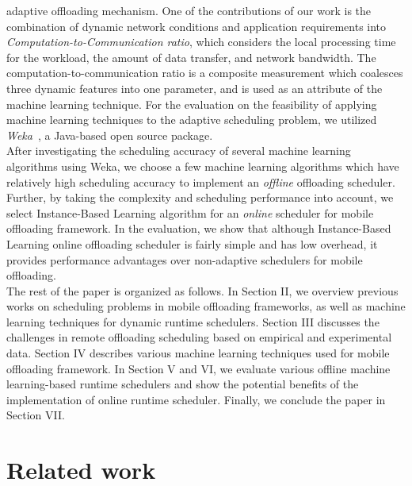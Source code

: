 \documentclass[10pt, conference, compsocconf]{IEEEtran}
\begin{document}
adaptive offloading mechanism.
%
One of the contributions of our work is the combination of dynamic network
conditions and application requirements into
\textit{Computation-to-Communication ratio}, which considers the local
processing time for the workload, the amount of data transfer, and
network bandwidth.
%
The computation-to-communication ratio is a composite
measurement which coalesces three dynamic features into one parameter,
and is used as an attribute of the machine learning technique.
%
For the evaluation on the feasibility of applying machine learning
techniques to the adaptive scheduling problem, we utilized
\textit{Weka}~\cite{weka}, a Java-based open source package.\\
%
\indent After investigating the scheduling accuracy of several machine
learning algorithms using Weka, we choose a few machine learning
algorithms which have relatively high scheduling accuracy 
to implement an \textit{offline} offloading scheduler.
%
Further, by taking the complexity and scheduling performance into
account, we select Instance-Based Learning algorithm for 
an \textit{online} scheduler for mobile offloading framework.
%
In the evaluation, we show that although Instance-Based Learning 
online offloading scheduler is fairly simple and has low overhead, 
it provides performance advantages over non-adaptive schedulers for
mobile offloading.\\
%
\indent The rest of the paper is organized as follows.
%
In Section II, we overview previous works on scheduling problems in
mobile offloading frameworks, as well as machine learning techniques for dynamic
runtime schedulers.
%
Section III discusses the challenges in remote offloading scheduling
based on empirical and experimental data.
%
Section IV describes various machine learning techniques used for mobile
offloading framework.
%
In Section V and VI, we evaluate various offline machine learning-based runtime
schedulers and show the potential benefits of the implementation of
online runtime scheduler.
%
Finally, we conclude the paper in Section VII.  
%
\section{Related work}
\end{document}
